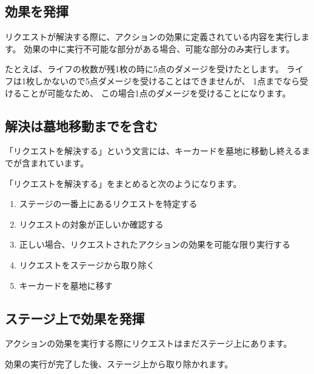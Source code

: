 \documentclass[letterpaper,10pt,dvipdfmx]{sphinxmanual}
\begin{document}
\subsection{効果を発揮}
\label{\detokenize{common/common-action:id11}}
\sphinxAtStartPar
リクエストが解決する際に、アクションの効果に定義されている内容を実行します。
効果の中に実行不可能な部分がある場合、可能な部分のみ実行します。

\sphinxAtStartPar
たとえば、ライフの枚数が残1枚の時に5点のダメージを受けたとします。
ライフは1枚しかないので5点ダメージを受けることはできませんが、
1点までなら受けることが可能なため、
この場合1点のダメージを受けることになります。


\subsection{解決は墓地移動までを含む}
\label{\detokenize{common/common-action:id12}}
\sphinxAtStartPar
「リクエストを解決する」という文言には、キーカードを墓地に移動し終えるまでが含まれています。

\sphinxAtStartPar
「リクエストを解決する」をまとめると次のようになります。
\begin{enumerate}
%
\item {} 
\sphinxAtStartPar
ステージの一番上にあるリクエストを特定する

\item {} 
\sphinxAtStartPar
リクエストの対象が正しいか確認する

\item {} 
\sphinxAtStartPar
正しい場合、リクエストされたアクションの効果を可能な限り実行する

\item {} 
\sphinxAtStartPar
リクエストをステージから取り除く

\item {} 
\sphinxAtStartPar
キーカードを墓地に移す

\end{enumerate}


\subsection{ステージ上で効果を発揮}
\label{\detokenize{common/common-action:id13}}
\sphinxAtStartPar
アクションの効果を実行する際にリクエストはまだステージ上にあります。

\sphinxAtStartPar
効果の実行が完了した後、ステージ上から取り除かれます。
\end{document}

